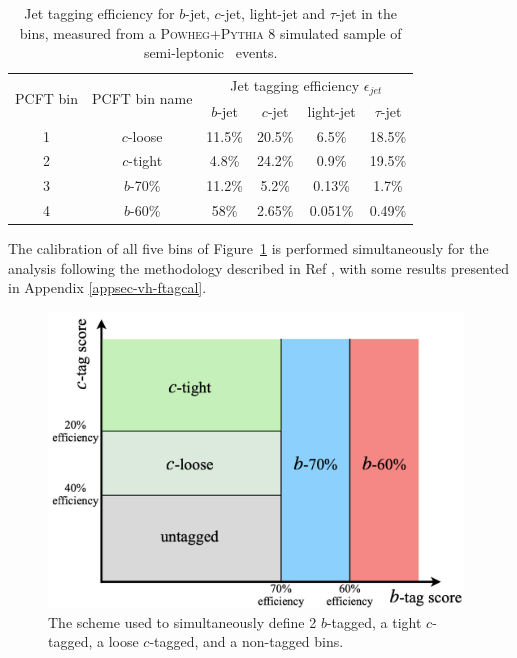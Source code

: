 \begin{itemize}
  \begin{table}[h!]
    \begin{center}
        \begin{tabular}{c|c|cccc}
          \hline \hline
          \multirow{2}{*}{PCFT bin} & \multirow{2}{*}{PCFT bin name} & \multicolumn{4}{c}{Jet tagging efficiency $\epsilon_{jet}$}\\
          & & $b$-jet &  $c$-jet &  light-jet & $\tau$-jet \\ 
          \hline
          1 & $c$-loose & 11.5\% & 20.5\% & 6.5\%   & 18.5\%\\
          2 & $c$-tight & 4.8\%  & 24.2\% & 0.9\%   & 19.5\%\\
          3 & $b$-70\%  & 11.2\% &  5.2\% & 0.13\%  &  1.7\%\\
          4 & $b$-60\%  & 58\%   & 2.65\% & 0.051\% & 0.49\%\\
          \hline \hline
        \end{tabular}
      \caption{Jet tagging efficiency for $b$-jet, $c$-jet, light-jet and $\tau$-jet in the  bins, measured from a \textsc{Powheg}+\textsc{Pythia} 8 simulated sample of semi-leptonic \ttb\ events.}
     \label{tbl:PCFTtageff} %
    \end{center}
  \end{table}
  The calibration of all five bins of Figure~\ref{fig:pseudotag} is performed simultaneously for the analysis following the methodology described in Ref \cite{atlas:FTAGRUN2}, with some results presented in Appendix \ref{appsec-vh-ftagcal}.
  \begin{figure}[h!]
    \center
      \begin{minipage}[c]{0.69\textwidth}
        \includegraphics[width=0.98\textwidth]{Images/VH/pseudocontinuous.png}
      \end{minipage}
      \begin{minipage}[c]{0.3\textwidth}
        \caption{The  scheme used to simultaneously define 2 $b$-tagged, a tight $c$-tagged, a loose $c$-tagged, and a non-tagged bins.} 
        \label{fig:pseudotag}
      \end{minipage}
  \end{figure}


\end{itemize}
